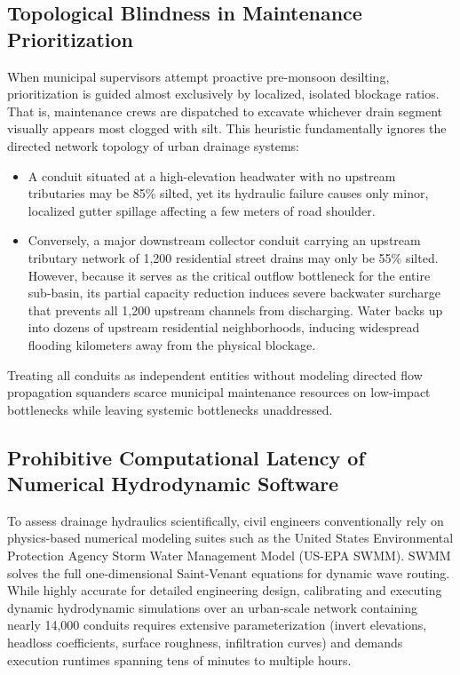 \subsection{Topological Blindness in Maintenance Prioritization}
When municipal supervisors attempt proactive pre-monsoon desilting, prioritization is guided almost exclusively by localized, isolated blockage ratios. That is, maintenance crews are dispatched to excavate whichever drain segment visually appears most clogged with silt. This heuristic fundamentally ignores the directed network topology of urban drainage systems:
\begin{itemize}
    \item A conduit situated at a high-elevation headwater with no upstream tributaries may be 85\% silted, yet its hydraulic failure causes only minor, localized gutter spillage affecting a few meters of road shoulder.
    \item Conversely, a major downstream collector conduit carrying an upstream tributary network of 1,200 residential street drains may only be 55\% silted. However, because it serves as the critical outflow bottleneck for the entire sub-basin, its partial capacity reduction induces severe backwater surcharge that prevents all 1,200 upstream channels from discharging. Water backs up into dozens of upstream residential neighborhoods, inducing widespread flooding kilometers away from the physical blockage.
\end{itemize}
Treating all conduits as independent entities without modeling directed flow propagation squanders scarce municipal maintenance resources on low-impact bottlenecks while leaving systemic bottlenecks unaddressed.

\subsection{Prohibitive Computational Latency of Numerical Hydrodynamic Software}
To assess drainage hydraulics scientifically, civil engineers conventionally rely on physics-based numerical modeling suites such as the United States Environmental Protection Agency Storm Water Management Model (US-EPA SWMM). SWMM solves the full one-dimensional Saint-Venant equations for dynamic wave routing. While highly accurate for detailed engineering design, calibrating and executing dynamic hydrodynamic simulations over an urban-scale network containing nearly 14,000 conduits requires extensive parameterization (invert elevations, headloss coefficients, surface roughness, infiltration curves) and demands execution runtimes spanning tens of minutes to multiple hours. 

